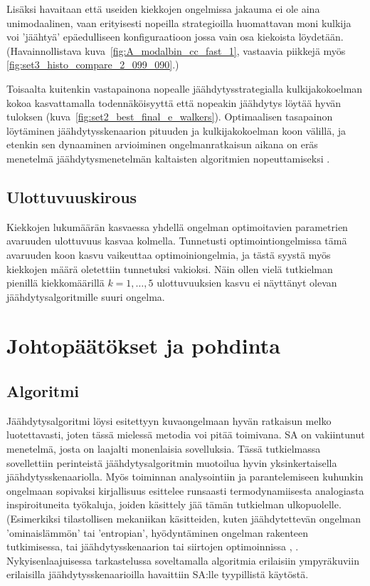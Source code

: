 Lisäksi havaitaan että useiden kiekkojen ongelmissa jakauma ei ole aina unimodaalinen,
vaan erityisesti nopeilla strategioilla huomattavan moni kulkija voi 'jäähtyä' epäedulliseen konfiguraatioon jossa vain osa kiekoista löydetään.
(Havainnollistava kuva~\ref{fig:A_modalbin_cc_fast_1}, vastaavia piikkejä myös \ref{fig:set3_histo_compare_2_099_090}.)

Toisaalta kuitenkin vastapainona nopealle jäähdytysstrategialla kulkijakokoelman kokoa kasvattamalla todennäköisyyttä että nopeakin jäähdytys löytää hyvän tuloksen (kuva~\ref{fig:set2_best_final_e_walkers}).
Optimaalisen tasapainon löytäminen jäähdytysskenaarion pituuden ja kulkijakokoelman koon välillä, ja etenkin sen dynaaminen arvioiminen ongelmanratkaisun aikana on eräs menetelmä jäähdytysmenetelmän kaltaisten algoritmien nopeuttamiseksi \cite{salamonetal}.

\subsection{Ulottuvuuskirous}
\label{sub:ulottuvuuskirous}

Kiekkojen lukumäärän kasvaessa yhdellä ongelman optimoitavien parametrien avaruuden ulottuvuus kasvaa kolmella.
Tunnetusti optimointiongelmissa tämä avaruuden koon kasvu vaikeuttaa optimoiniongelmia, ja tästä syystä myös kiekkojen määrä oletettiin tunnetuksi vakioksi.
Näin ollen vielä tutkielman pienillä kiekkomäärillä $k = 1, \dots, 5$ ulottuvuuksien kasvu ei näyttänyt olevan jäähdytysalgoritmille suuri ongelma.

\section{Johtopäätökset ja pohdinta}
\label{sec:johtopaatokset}

\subsection{Algoritmi}
\label{sub:jp_algoritmi}

Jäähdytysalgoritmi löysi esitettyyn kuvaongelmaan hyvän ratkaisun melko luotettavasti,
joten tässä mielessä metodia voi pitää toimivana.
SA on vakiintunut menetelmä, josta on laajalti monenlaisia sovelluksia.
Tässä tutkielmassa sovellettiin perinteistä jäähdytysalgoritmin muotoilua hyvin yksinkertaisella jäähdytysskenaariolla.
Myös toiminnan analysointiin ja parantelemiseen kuhunkin ongelmaan sopivaksi kirjallisuus esittelee runsaasti termodynamiisesta analogiasta inspiroituneita työkaluja,
joiden käsittely jää tämän tutkielman ulkopuolelle.
(Esimerkiksi tilastollisen mekaniikan käsitteiden, kuten jäähdytettevän ongelman 'ominaislämmön' tai 'entropian', hyödyntäminen ongelman rakenteen tutkimisessa, tai jäähdytysskenaarion tai siirtojen optimoinnissa , \cite[ks.][]{salamonetal}.
Nykyisenlaajuisessa tarkastelussa soveltamalla algoritmia erilaisiin ympyräkuviin erilaisilla jäähdytysskenaarioilla havaittiin SA:lle tyypillistä käytöstä.

